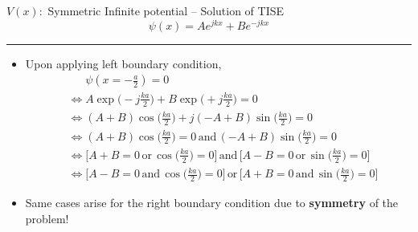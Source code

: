 %
\begin{frame}{\(V(x) :\) Symmetric Infinite potential -- Solution of TISE}
	\[
	\psi(x)  = A e^{j k x} + B e^{-j k x}
	\]
	\hrule
	\begin{itemize}
		\item Upon applying left boundary condition,
		\begin{align*}
			&\phantom{\Leftrightarrow}\psi(x=-\frac{a}{2}) = 0	\\
			&\Leftrightarrow A \exp\big(-j  \frac{ka}{2}\big) + B \exp\big(+j  \frac{ka}{2}\big) =0 \\
			&\Leftrightarrow (A+B)\cos \big( \frac{ka}{2}\big) + j (-A+B) \sin \big( \frac{ka}{2}\big) = 0\\
			& \Leftrightarrow (A+B)\cos \big( \frac{ka}{2}\big) = 0 \, \text{and} \, (-A+B) \sin \big( \frac{ka}{2}\big) = 0 \\
			& \Leftrightarrow \big[A+B = 0 \, \text{or} \, \cos \big( \frac{ka}{2}\big) = 0\big] \, \text{and} \, \big[A-B=0 \, \text{or} \, \sin \big( \frac{ka}{2}\big) = 0\big]	\\
			& \Leftrightarrow \big[A-B=0  \, \text{and} \, \cos \big( \frac{ka}{2}\big) = 0\big] \, \text{or} \,  \big[A+B = 0 \, \text{and} \, \sin \big( \frac{ka}{2}\big) = 0\big]
		\end{align*}
		\item Same cases arise for the right boundary condition due to \textbf{symmetry} of the problem!
	\end{itemize}
\end{frame}
%

